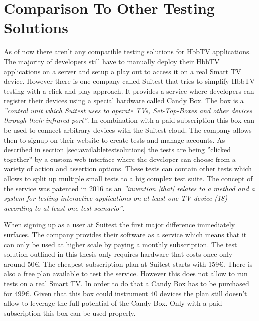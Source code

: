 \section{Comparison To Other Testing Solutions\label{sec:businessmodel}}

As of now there aren't any compatible testing solutions for HbbTV applications. The majority of developers still have to manually deploy their HbbTV applications on a server and setup a play out to access it on a real Smart TV device. However there is one company called Suitest that tries to simplify HbbTV testing with a click and play approach. It provides a service where developers can register their devices using a special hardware called Candy Box. The box is a \textit{''control unit which Suitest uses to operate TVs, Set-Top-Boxes and other devices through their infrared port''}\cite{candybox}. In combination with a paid subscription this box can be used to connect arbitrary devices with the Suitest cloud. The company allows then to signup on their website to create tests and manage accounts. As described in section \ref{sec:availabletestsolutions} the tests are being ''clicked together'' by a custom web interface where the developer can choose from a variety of action and assertion options. These tests can contain other tests which allows to split up multiple small tests to a big complex test suite. The concept of the service was patented in 2016 as an \textit{''invention [that] relates to a method and a system for testing interactive applications on at least one TV device (18) according to at least one test scenario''}\cite{krocek2016method}.

When signing up as a user at Suitest the first major difference immediately surfaces. The company provides their software as a service which means that it can only be used at higher scale by paying a monthly subscription. The test solution outlined in this thesis only requires hardware that costs once-only around 50\euro. The cheapest subscription plan at Suitest starts with 159\euro. There is also a free plan available to test the service. However this does not allow to run tests on a real Smart TV. In order to do that a Candy Box has to be purchased for 499\euro. Given that this box could instrument 40 devices the plan still doesn't allow to leverage the full potential of the Candy Box. Only with a paid subscription this box can be used properly.

